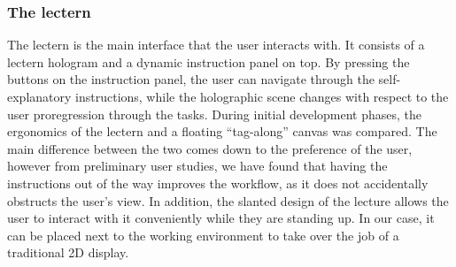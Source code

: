 \subsubsection{The lectern}
The lectern is the main interface that the user interacts with. It consists of a lectern hologram and a dynamic instruction panel on top. By pressing the buttons on the instruction panel, the user can navigate through the self-explanatory instructions, while the holographic scene changes with respect to the user proregression through the tasks. 
During initial development phases, the ergonomics of the lectern and a floating “tag-along” canvas was compared. The main difference between the two comes down to the preference of the user, however from preliminary user studies, we have found that having the instructions out of the way improves the workflow, as it does not accidentally obstructs the user’s view. In addition, the slanted design of the lecture allows the user to interact with it conveniently while they are standing up. In our case, it can be placed next to the working environment to take over the job of a traditional 2D display.
